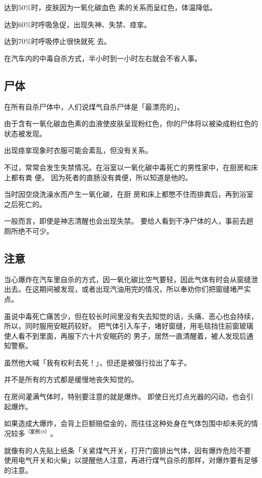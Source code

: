 \documentclass[UTF8]{ctexart}
\begin{document}
达到$50\%$时，皮肤因为一氧化碳血色 素的关系而呈红色，体温降低。 

达到$60\%$时呼吸急促，出现失神、失禁、痉挛。

达到$70\%$时呼吸停止很快就死 去。 

在汽车内的中毒自杀方式，半小时到一小时左右就会不省人事。

\subsection{尸体}

在所有自杀尸体中，人们说煤气自杀尸体是「最漂亮的」。

由于含有一氧化碳血色素的血液使皮肤呈现粉红色，你的尸体将以被染成粉红色的状态被发现。

出现痉挛现象时衣服可能会紊乱，但没有关系。

不过，常常会发生失禁情况。在浴室以一氧化碳中毒死亡的男性家中，在厨房和床上都有粪 便。
因为死者的直肠没有粪便，所以知道是他的。

当时因空烧洗澡水而产生一氧化碳，在厨 房和床上都憋不住而排粪后，再到浴室之后死亡的。

一般而言，即使是神志清醒也会出现失禁。
要给人看到干净尸体的人，事前去趟厕所绝不可少。

\subsection{注意}

当心爆炸在汽车里自杀的方式，因一氧化碳比空气要轻，因此气体有时会从窗缝泄出去。在这期间被发现，或者出现汽油用完的情况，所以奉劝你们把窗缝堵严实点。

虽说中毒死亡痛苦少，但在较长时间里没有失去知觉的话，头痛、恶心也会持续，所以，同时服用安眠药较好。
把气体引入车子，堵好窗缝，用毛毯挡住前窗玻璃使人看不到里面，再服下六十片安眠药的 男子，居然一直清醒着，被人发现后通知警察。

虽然他大喊「我有权利去死！」，但还是被强行拉出了车子。

并不是所有的方式都是缓慢地丧失知觉的。 

在房间灌满气体时，特别要注意的就是爆炸。
即使日光灯点光器的闪动，也会引起爆炸。

如果造成大爆炸，会背上巨额赔偿金的，而往往这种处身在气体包围中却未死的情况较多$^{（案例 18）}$。

就像有的人先贴上纸条「关紧煤气开关，打开门窗排出气体，因有爆炸危险不要 使用电气开关和火柴」以提醒他人注意，再进行煤气自杀的那样，对爆炸要有足够的注意。
\end{document}
